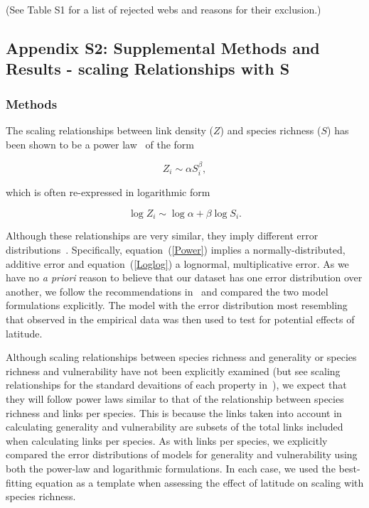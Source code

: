 \documentclass[12pt]{article}
\begin{document}
\begin{landscape}
 (See Table S1 for a list of rejected webs and reasons for their
  exclusion.) 

\subsection*{Appendix S2: Supplemental Methods and Results - scaling Relationships with S}

  \subsubsection*{Methods}

    The scaling relationships between link density ($Z$) and species richness ($S$)
    has been shown to be a power law~\citep{Riede2010} of the form 

    \begin{equation}
    \label{Power}
    Z_{i} \sim \alpha S_{i}^{\beta}  ,
    \end{equation}

    \noindent which is often re-expressed in logarithmic form 

    \begin{equation}
    \label{Loglog}
    \log{Z_{i}} \sim \log{\alpha} + \beta\log{S_{i}}  .
    \end{equation}

    \noindent Although these relationships are very similar, they imply different error distributions~\citep{Xiao2011}.
    Specifically, equation~(\ref{Power}) implies a normally-distributed, additive error and equation~(\ref{Loglog}) a lognormal,
    multiplicative error. As we have no \emph{a priori} reason to believe that our dataset has one error distribution
    over another, we follow the recommendations in~\citet{Xiao2011} and compared the two
    model formulations explicitly. The model with the error distribution most resembling that observed in the empirical
    data was then used to test for potential effects of latitude.


    Although scaling relationships between species richness and generality or
    species richness and vulnerability have not been explicitly examined (but see scaling 
    relationships for the standard devaitions of each property in~\citet{Riede2010}), we expect that they will follow
    power laws similar to that of the relationship between species richness and links per species.
    This is because the links taken into account in calculating generality and vulnerability are subsets 
    of the total links included when calculating links per species. As with links per species, we explicitly 
    compared the error distributions of models for generality and vulnerability using
    both the power-law and logarithmic formulations. 
    In each case, we used the best-fitting equation as a template when assessing the effect of latitude on scaling with
    species richness.



\end{landscape}
\end{document}

